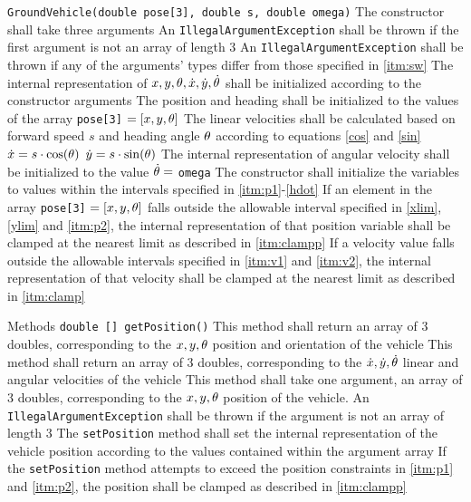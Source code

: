 \documentclass[12pt]{article}
\begin{document}
\dle 

		\ele
	\ele
\dl \label{itm:sw} {\tt GroundVehicle(double pose[3], double s, double omega)}
	\ble The constructor shall take three arguments
		\ble An {\tt IllegalArgumentException} shall be thrown if the first argument is not an array of length 3\ele
		\ble An {\tt IllegalArgumentException} shall be thrown if any of the arguments' types differ from those specified in \ref{itm:sw}\ele
	\dl The internal representation of $x, y, \theta, \dot{x}, \dot{y}, \dot{\theta}$ shall be initialized according to the constructor arguments
		\ble The position and heading shall be initialized to the values of the array {\tt pose[3]} $= [x,y,\theta]$
		\dl \label{som} The linear velocities shall be calculated based on forward speed $s$ and heading angle $\theta$ according to equations \ref{cos} and \ref{sin}
		\ble \label{cos} $\dot{x} = s\cdot\cos(\theta)$ 
		\dl \label{sin} $\dot{y} = s\cdot\sin(\theta)$
		\ele
		\dl \label{sow} The internal representation of angular velocity shall be initialized to the value $\dot{\theta} =$ {\tt omega}
		\ele
	\dl The constructor shall initialize the variables to values within the intervals specified in \ref{itm:p1}-\ref{hdot} 
		\ble  If an element in the array {\tt pose[3]} $= [x,y,\theta]$ falls outside the allowable interval specified in \ref{xlim}, \ref{ylim} and \ref{itm:p2}, the internal representation of that position variable shall be clamped at the nearest limit as described in \ref{itm:clampp}
				\dl  If a velocity value falls outside the allowable intervals specified in \ref{itm:v1} and \ref{itm:v2}, the internal representation of that velocity shall be clamped at the nearest limit as described in \ref{itm:clamp}

\ele\ele
\dl Methods
\ble
	{\tt double [] getPosition()} 
	\ble This method shall return an array of 3 doubles, corresponding to the $x, y, \theta$ position and orientation of the vehicle\ele
	\ble This method shall return an array of 3 doubles, corresponding to the $\dot{x}, \dot{y}, \dot{\theta}$ linear and angular velocities of the vehicle\ele
	\ble This method shall take one argument, an array of 3 doubles, corresponding to the $x, y, \theta$ position of the vehicle.
	\ble  An {\tt IllegalArgumentException} shall be thrown if the argument is not an array of length 3\ele
	\dl The {\tt setPosition} method shall set the internal representation of the vehicle position according to the values contained within the argument array
	\dl If the {\tt setPosition} method attempts to exceed the position constraints in  \ref{itm:p1} and  \ref{itm:p2}, the position shall be clamped as described in \ref{itm:clampp}	\ele
	
\end{document}
